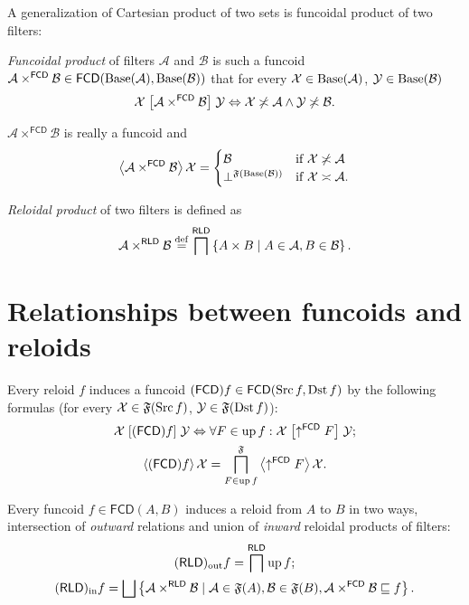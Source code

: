\documentclass{amsart}
\begin{document}
A generalization of Cartesian product of two sets is funcoidal product
of two filters:
\begin{defn}
\emph{Funcoidal product} of filters $\mathcal{A}$
and $\mathcal{B}$ is such a funcoid
$\mathcal{A}\times^{\mathsf{FCD}}\mathcal{B}\in\mathsf{FCD}(\operatorname{Base}(\mathcal{A}
),\operatorname{Base}(\mathcal{B}))$
that for every $\mathcal{X}\in\operatorname{Base}(\mathcal{A})$,
$\mathcal{Y}\in\operatorname{Base}(\mathcal{B})$
\[
\mathcal{X}\mathrel{\left[\mathcal{A}\times^{\mathsf{FCD}}\mathcal{B}\right]}\mathcal{Y}
\Leftrightarrow\mathcal{X}\not\asymp\mathcal{A}\land\mathcal{Y}\not\asymp\mathcal{B}.
\]
\end{defn}
\begin{prop}
$\mathcal{A}\times^{\mathsf{FCD}}\mathcal{B}$ is really a funcoid
and
\[
\left\langle \mathcal{A}\times^{\mathsf{FCD}}\mathcal{B}\right\rangle\mathcal{X}=\begin{cases}
\mathcal{B} & \text{if }\mathcal{X}\not\asymp\mathcal{A}\\
\bot^{\mathfrak{F}(\operatorname{Base}(\mathcal{B}))} & \text{if }\mathcal{X}\asymp\mathcal{A}.
\end{cases}
\]
\end{prop}

\emph{Reloidal product} of two filters is defined as
\[
\mathcal{A}\times^{\mathsf{RLD}}\mathcal{B}\overset{\mathrm{def}}{=}\bigsqcap^{\mathsf{RLD}}\left\{ A\times B \mid A\in\mathcal{A},B\in\mathcal{B} \right\}.
\]

\section{Relationships between funcoids and reloids}

Every reloid $f$ induces a funcoid
$(\mathsf{FCD}) f\in\mathsf{FCD}(\operatorname{Src} f,\operatorname{Dst} f)$ by the following formulas
(for every $\mathcal{X}\in\mathfrak{F}(\operatorname{Src} f)$, $\mathcal{Y}\in\mathfrak{F}(\operatorname{Dst} f)$):
\begin{gather*}
\mathcal{X}\mathrel{\left[(\mathsf{FCD}) f\right]}\mathcal{Y}\Leftrightarrow\forall F\in\operatorname{up} f:\mathcal{X}\mathrel{\left[\uparrow^{\mathsf{FCD}}F\right]}\mathcal{Y};\\
\left\langle (\mathsf{FCD}) f\right\rangle\mathcal{X}=\bigsqcap_{F\in\operatorname{up} f}^{\mathfrak{F}}\left\langle \uparrow^{\mathsf{FCD}}F\right\rangle\mathcal{X}.
\end{gather*}

Every funcoid $f\in\mathsf{FCD}(A,B)$
induces a reloid from $A$ to $B$ in two ways, intersection of \emph{outward}
relations and union of \emph{inward} reloidal products of filters:
\begin{gather*}
\torldout f=\bigsqcap^{\mathsf{RLD}}\up f;\\
\torldin f=\bigsqcup\setcond{\mathcal{A}\times^{\mathsf{RLD}}\mathcal{B}}{\mathcal{A}\in\mathfrak{F}(A),\mathcal{B}\in\mathfrak{F}(B),\mathcal{A}\times^{\mathsf{FCD}}\mathcal{B}\sqsubseteq f}.
\end{gather*}
\end{document}
